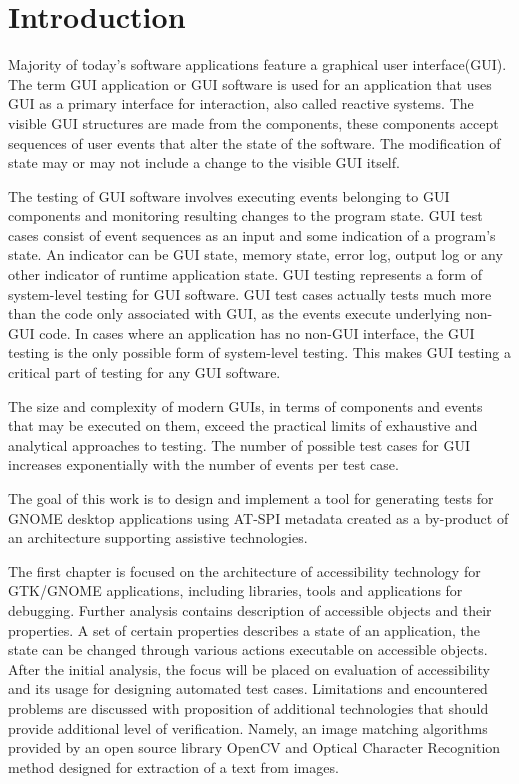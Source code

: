 
\chapter{Introduction}
Majority of today's software applications feature a graphical user interface(GUI). The term GUI application or GUI software is used for an application that uses GUI as a primary interface for interaction, also called reactive systems. The visible GUI structures are made from the components, these components accept sequences of user events that alter the state of the software. The modification of state may or may not include a change to the visible GUI itself. 

The testing of GUI software involves executing events belonging to GUI components and monitoring resulting changes to the program state. GUI test cases consist of event sequences as an input and some indication of a program's state. An indicator can be GUI state, memory state, error log, output log or any other indicator of runtime application state. GUI testing represents a form of system-level testing for GUI software. GUI test cases actually tests much more than the code only associated with GUI, as the events execute underlying non-GUI code. In cases where an application has no non-GUI interface, the GUI testing is the only possible form of system-level testing. This makes GUI testing a critical part of testing for any GUI software.

The size and complexity of modern GUIs, in terms of components and events that may be executed on them, exceed the practical limits of exhaustive and analytical approaches to testing. The number of possible test cases for GUI increases exponentially with the number of events per test case.\cite{NguyenBao2014Gait}

The goal of this work is to design and implement a tool for generating tests for GNOME desktop applications using AT-SPI metadata created as a by-product of an architecture supporting assistive technologies.

The first chapter is focused on the architecture of accessibility technology for GTK/GNOME applications, including libraries, tools and applications for debugging. Further analysis contains description of accessible objects and their properties. A set of certain properties describes a state of an application, the state can be changed through various actions executable on accessible objects. After the initial analysis, the focus will be placed on evaluation of accessibility and its usage for designing automated test cases. Limitations and encountered problems are discussed with proposition of additional technologies that should provide additional level of verification. Namely, an image matching algorithms provided by an open source library OpenCV and Optical Character Recognition method designed for extraction of a text from images.


